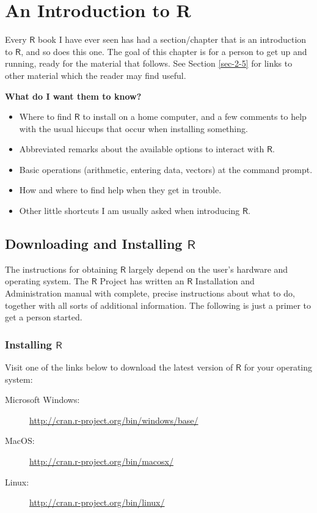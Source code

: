 \chapter{An Introduction to R}
\label{sec-2}

Every \(\mathsf{R}\) book I have ever seen has had a section/chapter
that is an introduction to \(\mathsf{R}\), and so does this one.  The
goal of this chapter is for a person to get up and running, ready for
the material that follows.  See Section \ref{sec-2-5} for links
to other material which the reader may find useful.

\textbf{What do I want them to know?}
\begin{itemize}
\item Where to find \(\mathsf{R}\) to install on a home computer, and a
few comments to help with the usual hiccups that occur when
installing something.
\item Abbreviated remarks about the available options to interact with
\(\mathsf{R}\).
\item Basic operations (arithmetic, entering data, vectors) at the command
prompt.
\item How and where to find help when they get in trouble.
\item Other little shortcuts I am usually asked when introducing
\(\mathsf{R}\).
\end{itemize}

\section{Downloading and Installing \(\mathsf{R}\)}
\label{sec-2-1}

The instructions for obtaining \(\mathsf{R}\) largely depend on the
user's hardware and operating system. The \(\mathsf{R}\) Project has
written an \(\mathsf{R}\) Installation and Administration manual with
complete, precise instructions about what to do, together with all
sorts of additional information. The following is just a primer to get
a person started.

\subsection{Installing \(\mathsf{R}\)}
\label{sec-2-1-1}

Visit one of the links below to download the latest version of \(\mathsf{R}\) 
for your operating system:

\begin{description}
\item[{Microsoft Windows:}] \url{http://cran.r-project.org/bin/windows/base/}
\item[{MacOS:}] \url{http://cran.r-project.org/bin/macosx/}
\item[{Linux:}] \url{http://cran.r-project.org/bin/linux/}
\end{description}

